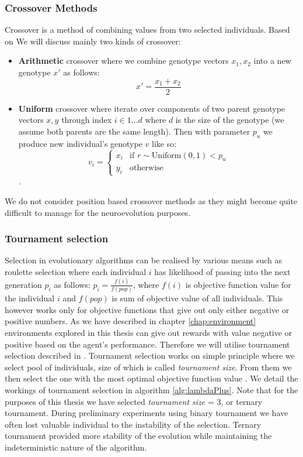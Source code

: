 \subsubsection{Crossover Methods}
Crossover is a  method of combining values from two selected individuals. Based on 
We will discuss mainly two kinds of crossover:
 \begin{itemize}
 	\item \textbf{Arithmetic} crossover where we combine genotype vectors $ x_1, x_2 $ into a new genotype $ x' $ as follows: $$ x' = \frac{x_1 + x_2}{2} $$
 	\item \textbf{Uniform} crossover where iterate over components of two parent genotype vectors $ x,y $ through index $ i \in 1\dots d$ where $ d $ is the size of the genotype (we assume both parents are the same length). Then with parameter $ p_u $ we produce new individual's genotype $ v $ like so: $$ v_i = \begin{cases}
 		x_i & \text{if } r\sim\mathrm{Uniform}(0,1) < p_u \\
 		y_i & \text{otherwise}
 	\end{cases}$$.
 \end{itemize}

We do not consider position based crossover methods as they might become quite difficult to manage for the neuroevolution purposes.
\subsubsection{Tournament selection}
\label{subsec:tournament}
Selection in evolutionary algorithms can be realised by various means such as roulette selection where each individual $ i $ has likelihood of passing into the next generation $ p_i $ as follows: $ p_i = \frac{f(i)}{f(pop)}$, where $ f(i) $ is objective function value for the individual $ i $ and $ f(pop) $ is sum of objective value of all individuals. This however works only for objective functions that give out only either negative or positive numbers. As we have described in chapter \ref{chap:environment} environments explored in this thesis can give out rewards with value negative or positive based on the agent's performance. Therefore we will utilise tournament selection described in \cite{GOLDBERG199169}. Tournament selection works on simple principle where we select pool of individuals, size of which is called \textit{tournament size}. From them we then select the one with the most optimal objective function value \citep{GOLDBERG199169}. We detail the workings of tournament selection in algorithm \ref{alg:lambdaPlus}. Note that for the purposes of this thesis we have selected \textit{tournament size} = 3, or ternary tournament. During preliminary experiments using binary tournament we have often lost valuable individual to the instability of the selection. Ternary tournament provided more stability of the evolution while maintaining the indeterministic nature of the algorithm. 
 

